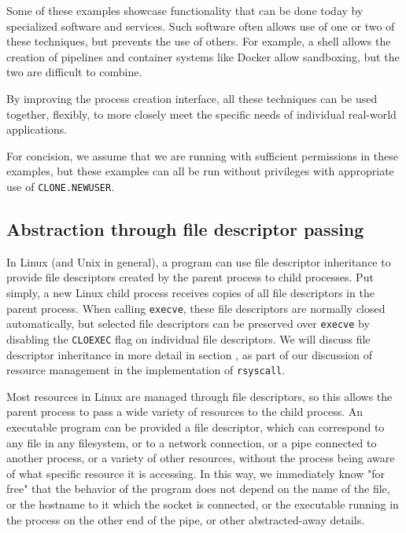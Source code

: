 \documentclass[sigplan]{acmart}
\begin{document}
Some of these examples showcase functionality that can be done today by specialized software and services.
Such software often allows use of one or two of these techniques, but prevents the use of others.
For example, a shell allows the creation of pipelines and container systems like Docker allow sandboxing,
but the two are difficult to combine.

By improving the process creation interface,
all these techniques can be used together, flexibly,
to more closely meet the specific needs of individual real-world applications.

For concision, we assume that we are running with sufficient permissions in these examples,
but these examples can all be run without privileges with appropriate use of \texttt{CLONE.NEWUSER}.
\subsection{Abstraction through file descriptor passing}\label{fd_abstraction}
In Linux (and Unix in general),
a program can use file descriptor inheritance
to provide file descriptors created by the parent process to child processes.
Put simply,
a new Linux child process receives copies of all file descriptors in the parent process.
When calling \texttt{execve}, these file descriptors are normally closed automatically,
but selected file descriptors can be preserved over \texttt{execve}
by disabling the \texttt{CLOEXEC} flag on individual file descriptors.
We will discuss file descriptor inheritance in more detail in section \label{fdtables},
as part of our discussion of resource management in the implementation of \texttt{rsyscall}.

Most resources in Linux are managed through file descriptors,
so this allows the parent process to pass a wide variety of resources to the child process.
An executable program can be provided a file descriptor,
which can correspond to any file in any filesystem,
or to a network connection\cite{ucspi},
or a pipe connected to another process,
or a variety of other resources,
without the process being aware of what specific resource it is accessing.
In this way, we immediately know "for free"\cite{theoremsforfree}
that the behavior of the program does not depend on the name of the file,
or the hostname to it which the socket is connected,
or the executable running in the process on the other end of the pipe,
or other abstracted-away details.
\end{document}
